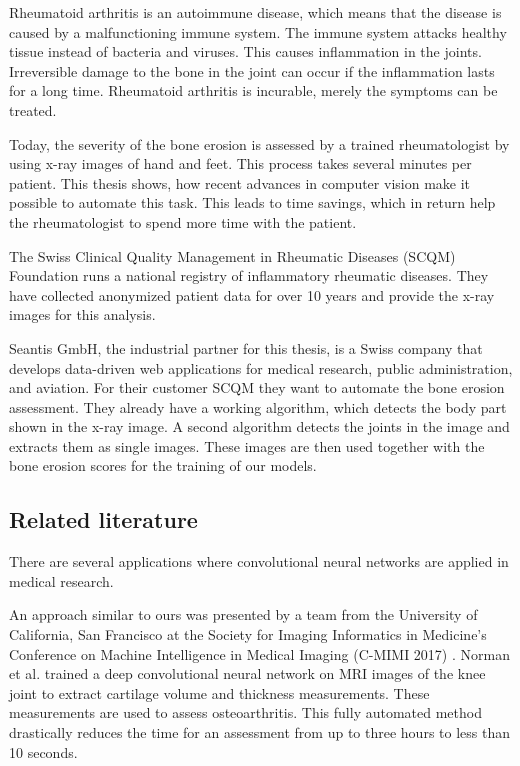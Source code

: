 \documentclass[12pt]{article}
\begin{document}
Rheumatoid arthritis is an autoimmune disease, which means that the disease is caused by a malfunctioning immune system. The immune system attacks healthy tissue instead of bacteria and viruses. This causes inflammation in the joints. Irreversible damage to the bone in the joint can occur if the inflammation lasts for a long time. \cite{rheuma} Rheumatoid arthritis is incurable, merely the symptoms can be treated.

Today, the severity of the bone erosion is assessed by a trained rheumatologist by using x-ray images of hand and feet. This process takes several minutes per patient. This thesis shows, how recent advances in computer vision make it possible to automate this task. This leads to time savings, which in return help the rheumatologist to spend more time with the patient.

The Swiss Clinical Quality Management in Rheumatic Diseases (SCQM) Foundation runs a national registry of inflammatory rheumatic diseases. \cite{scqm_about} They have collected anonymized patient data for over 10 years and provide the x-ray images for this analysis.

Seantis GmbH, the industrial partner for this thesis, is a Swiss company that develops data-driven web applications for medical research, public administration, and aviation. \cite{seantis_about} For their customer SCQM they want to automate the bone erosion assessment. They already have a working algorithm, which detects the body part shown in the x-ray image. A second algorithm detects the joints in the image and extracts them as single images. These images are then used together with the bone erosion scores for the training of our models.


\subsection{Related literature}


There are several applications where convolutional neural networks are applied in medical research.

An approach similar to ours was presented by a team from the University of California, San Francisco at the Society for Imaging Informatics in Medicine's Conference on Machine Intelligence in Medical Imaging (C-MIMI 2017) \cite{auntminnie}. Norman et al. \cite{norman} trained a deep convolutional neural network on MRI images of the knee joint to extract cartilage volume and thickness measurements. These measurements are used to assess osteoarthritis. This fully automated method drastically reduces the time for an assessment from up to three hours to less than 10 seconds.
\end{document}
